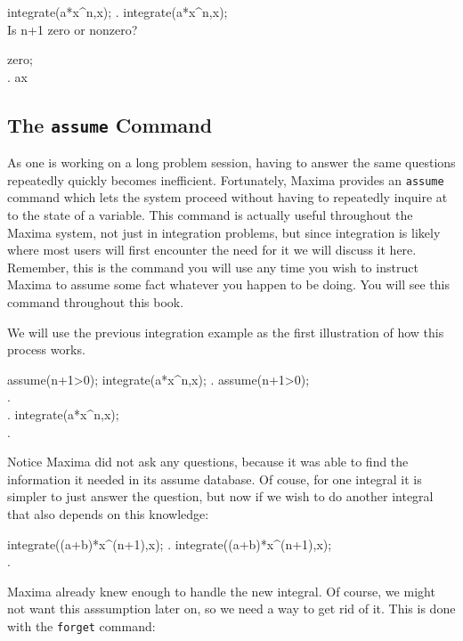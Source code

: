 \beginmaximasession
integrate(a*x^n,x);
\maximatexsession
{}.  integrate(a*x^n,x); \\
\p
Is  n+1  zero or nonzero?

zero; \\
.  a\*\log x \\
\endmaximasession

\subsection{The {\tt assume} Command}

As one is working on a long problem session, having to answer the same
questions repeatedly quickly becomes inefficient.  Fortunately, Maxima
provides an {\tt assume} command which lets the system proceed without
having to repeatedly inquire at to the state of a variable.  This command
is actually useful throughout the Maxima system, not just in integration
problems, but since integration is likely where most users will first
encounter the need for it we will discuss it here.  Remember, this 
is the command you will use any time you wish to instruct Maxima to
assume some fact whatever you happen to be doing.  You will see this
command throughout this book.

We will use the previous integration example as the first illustration of
how this process works.

\beginmaximasession
assume(n+1>0);
integrate(a*x^n,x);
\maximatexsession
{}.  assume(n+1>0); \\
.  \left[ n>-1 \right] \\
.  integrate(a*x^n,x); \\
.   \\
\endmaximasession

Notice Maxima did not ask any questions, because it was able to find the
information it needed in its assume database.  Of couse, for one integral
it is simpler to just answer the question, but now if we wish to do another
integral that also depends on this knowledge:

\beginmaximasession
integrate((a+b)*x^(n+1),x);
\maximatexsession
{}.  integrate((a+b)*x^(n+1),x); \\
.   \\
\endmaximasession

Maxima already knew enough to handle the new integral.  Of course, we 
might not want this asssumption later on, so we need a way to get rid
of it.  This is done with the {\tt forget} command:

